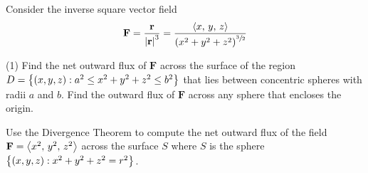 \documentclass[mathNotesPreamble]{subfiles}
\begin{document}
  \begin{ex*}
    Consider the inverse square vector field
      \[\mathbf F=\frac{{\mathbf{r}}}{{\left\vert{\mathbf{r}}\right\vert}^3}=\frac{{\left\langle x,\,y,\,z \right\rangle}}{{\left(x^2+y^2+z^2\right)}^{\sfrac{3}{2}}}\]
  \end{ex*}
  \begin{tasks}[after-item-skip=\stretch{1}, label=, item-indent=0pt](1)
    \task Find the net outward flux of $\mathbf F$ across the surface of the region \newline $D={\left\{(x,y,z): a^2\leq x^2+y^2+z^2\leq b^2\right\}}$ that lies between concentric spheres with radii $a$ and $b$.
    \task 
      Find the outward flux of $\mathbf F$ across any sphere that encloses the origin.
  \end{tasks}
  \pagebreak

  \begin{ex*}
    Use the Divergence Theorem to compute the net outward flux of the field $\mathbf F={\left\langle x^2,\,y^2,\,z^2 \right\rangle}$ across the surface $S$ where $S$ is the sphere ${\left\{(x,y,z): x^2+y^2+z^2=r^2\right\}}$.
  \end{ex*}
  \pagebreak
\end{document}
